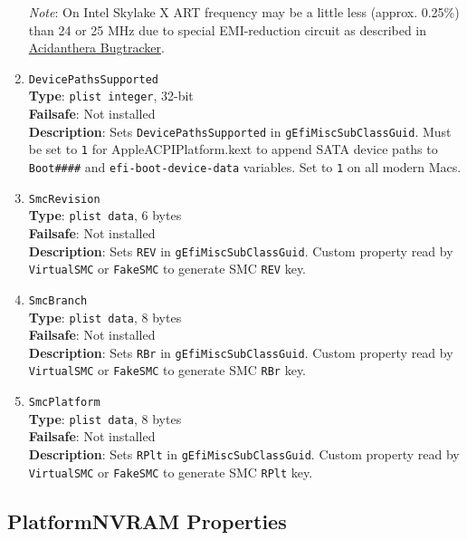 \documentclass[]{article}
\makeatletter
\renewcommand{\label}[1]{%
\zref@wrapper@immediate{\oldlabel{#1}}}  %
\makeatother
\begin{document}
\begin{enumerate}
  \emph{Note}: On Intel Skylake X ART frequency may be a little less (approx. 0.25\%) than
  24 or 25 MHz due to special EMI-reduction circuit as described in
  \href{https://github.com/acidanthera/bugtracker/issues/448#issuecomment-524914166}{Acidanthera Bugtracker}.
\item
  \texttt{DevicePathsSupported}\\
  \textbf{Type}: \texttt{plist\ integer}, 32-bit\\
  \textbf{Failsafe}: Not installed\\
  \textbf{Description}: Sets \texttt{DevicePathsSupported} in
  \texttt{gEfiMiscSubClassGuid}. Must be set to \texttt{1} for
  AppleACPIPlatform.kext to append SATA device paths to
  \texttt{Boot\#\#\#\#} and \texttt{efi-boot-device-data} variables.
  Set to \texttt{1} on all modern Macs.
\item
  \texttt{SmcRevision}\\
  \textbf{Type}: \texttt{plist\ data}, 6 bytes\\
  \textbf{Failsafe}: Not installed\\
  \textbf{Description}: Sets \texttt{REV} in
  \texttt{gEfiMiscSubClassGuid}. Custom property read by
  \texttt{VirtualSMC} or \texttt{FakeSMC} to generate SMC \texttt{REV}
  key.
\item
  \texttt{SmcBranch}\\
  \textbf{Type}: \texttt{plist\ data}, 8 bytes\\
  \textbf{Failsafe}: Not installed\\
  \textbf{Description}: Sets \texttt{RBr} in
  \texttt{gEfiMiscSubClassGuid}. Custom property read by
  \texttt{VirtualSMC} or \texttt{FakeSMC} to generate SMC \texttt{RBr}
  key.
\item
  \texttt{SmcPlatform}\\
  \textbf{Type}: \texttt{plist\ data}, 8 bytes\\
  \textbf{Failsafe}: Not installed\\
  \textbf{Description}: Sets \texttt{RPlt} in
  \texttt{gEfiMiscSubClassGuid}. Custom property read by
  \texttt{VirtualSMC} or \texttt{FakeSMC} to generate SMC \texttt{RPlt}
  key.
\end{enumerate}

\subsection{PlatformNVRAM Properties}\label{platforminfonvram}
\end{document}
